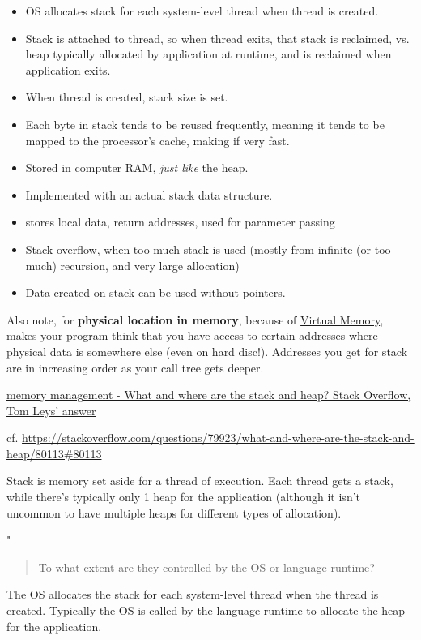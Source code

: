 \documentclass[10pt]{amsart}
\begin{document}
\begin{multicols*}{2}
\begin{itemize}
	\item OS allocates stack for each system-level thread when thread is created.  
	\item Stack is attached to thread, so when thread exits, that stack is reclaimed, vs. heap typically allocated by application at runtime, and is reclaimed when application exits.  
	\item When thread is created, stack size is set.  
	\item Each byte in stack tends to be reused frequently, meaning it tends to be mapped to the processor's cache, making if very fast.  
	\item Stored in computer RAM, \emph{just like} the heap.  
	\item Implemented with an actual stack data structure.  
	\item stores local data, return addresses, used for parameter passing  
	\item Stack overflow, when too much stack is used (mostly from infinite (or too much) recursion, and very large allocation)
	\item Data created on stack can be used without pointers.  
\end{itemize}

Also note, for \textbf{physical location in memory}, because of \href{http://en.wikipedia.org/wiki/Virtual_memory}{Virtual Memory}, makes your program think that you have access to certain addresses where physical data is somewhere else (even on hard disc!).  Addresses you get for stack are in increasing order as your call tree gets deeper.  

\href{http://stackoverflow.com/questions/79923/what-and-where-are-the-stack-and-heap/79988#79988}{memory management - What and where are the stack and heap? Stack Overflow, Tom Leys' answer}

cf. \url{https://stackoverflow.com/questions/79923/what-and-where-are-the-stack-and-heap/80113#80113}  

Stack is memory set aside for a thread of execution.  Each thread gets a stack, while there's typically only 1 heap for the application (although it isn't uncommon to have multiple heaps for different types of allocation).  

"
\begin{quotation}
To what extent are they controlled by the OS or language runtime?
\end{quotation}

The OS allocates the stack for each system-level thread when the thread is created. Typically the OS is called by the language runtime to allocate the heap for the application.


\end{multicols*}
\end{document}
